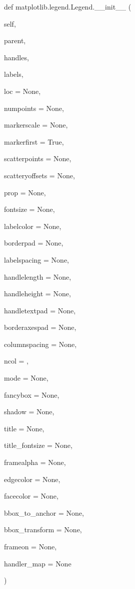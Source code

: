 {\footnotesize\ttfamily def matplotlib.\+legend.\+Legend.\+\_\+\+\_\+init\+\_\+\+\_\+ (\begin{DoxyParamCaption}\item[{}]{self,  }\item[{}]{parent,  }\item[{}]{handles,  }\item[{}]{labels,  }\item[{}]{loc = {\ttfamily None},  }\item[{}]{numpoints = {\ttfamily None},  }\item[{}]{markerscale = {\ttfamily None},  }\item[{}]{markerfirst = {\ttfamily True},  }\item[{}]{scatterpoints = {\ttfamily None},  }\item[{}]{scatteryoffsets = {\ttfamily None},  }\item[{}]{prop = {\ttfamily None},  }\item[{}]{fontsize = {\ttfamily None},  }\item[{}]{labelcolor = {\ttfamily None},  }\item[{}]{borderpad = {\ttfamily None},  }\item[{}]{labelspacing = {\ttfamily None},  }\item[{}]{handlelength = {\ttfamily None},  }\item[{}]{handleheight = {\ttfamily None},  }\item[{}]{handletextpad = {\ttfamily None},  }\item[{}]{borderaxespad = {\ttfamily None},  }\item[{}]{columnspacing = {\ttfamily None},  }\item[{}]{ncol = {},  }\item[{}]{mode = {\ttfamily None},  }\item[{}]{fancybox = {\ttfamily None},  }\item[{}]{shadow = {\ttfamily None},  }\item[{}]{title = {\ttfamily None},  }\item[{}]{title\+\_\+fontsize = {\ttfamily None},  }\item[{}]{framealpha = {\ttfamily None},  }\item[{}]{edgecolor = {\ttfamily None},  }\item[{}]{facecolor = {\ttfamily None},  }\item[{}]{bbox\+\_\+to\+\_\+anchor = {\ttfamily None},  }\item[{}]{bbox\+\_\+transform = {\ttfamily None},  }\item[{}]{frameon = {\ttfamily None},  }\item[{}]{handler\+\_\+map = {\ttfamily None} }\end{DoxyParamCaption})}

